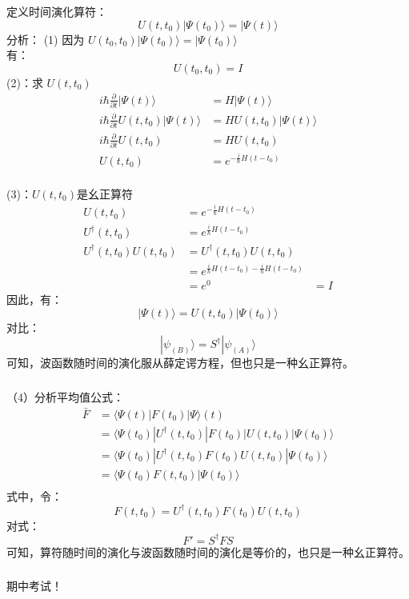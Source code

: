 \begin{frame}  
    \frametitle{}  
    定义时间演化算符：
    $$ U(t,t_0) |\Psi(t_0)\rangle = |\Psi(t)\rangle  $$
    \alert{分析}：
    (1) 因为 $ U(t_0,t_0) |\Psi(t_0)\rangle = |\Psi(t_0)\rangle  $ \\
     有：$$ U(t_0,t_0)=I $$
    (2)：求 $ U(t,t_0)$
    $$ \begin{aligned}
        i\hbar \frac{\partial }{\partial t} |\Psi(t)\rangle &= H|\Psi(t)\rangle  \\
        i\hbar \frac{\partial }{\partial t}  U(t,t_0) |\Psi(t)\rangle &= H U(t,t_0) |\Psi(t)\rangle  \\
        i\hbar \frac{\partial }{\partial t}  U(t,t_0)  &= H U(t,t_0)  \\
        U(t,t_0)  &= e^{-\frac{i}{\hbar} H(t-t_0)}  \\
    \end{aligned} $$
\end{frame} 

\begin{frame}  
    (3)：$ U(t,t_0)$是幺正算符
    $$ \begin{aligned}
        U(t,t_0)  &= e^{-\frac{i}{\hbar} H(t-t_0)}  \\
        U^\dagger (t,t_0)  &= e^{\frac{i}{\hbar} H(t-t_0)}  \\
        U^\dagger (t,t_0)U(t,t_0) &= U^\dagger (t,t_0)U(t,t_0) \\
         &=e^{\frac{i}{\hbar} H(t-t_0)-\frac{i}{\hbar} H(t-t_0)} \\
         &=e^0
         &=I
    \end{aligned} $$
    因此，有：
    $$ |\Psi(t)\rangle = U(t,t_0) |\Psi(t_0)\rangle   $$
    对比： 
    $$ |\psi_{(B)}\rangle = S^\dagger |\psi_{(A)}\rangle $$
    可知，波函数随时间的演化服从薛定谔方程，但也只是一种幺正算符。
\end{frame} 

\begin{frame}  
    \frametitle{} 
    （4）分析平均值公式：
    $$ \begin{aligned}
        \bar{F} &= \langle \Psi(t) |F(t_0) | \Psi \rangle(t)  \\
        &= \langle \Psi(t_0) |U^\dagger (t,t_0) |F(t_0) | U(t,t_0) |\Psi(t_0)\rangle   \\
        &= \langle \Psi(t_0) |U^\dagger (t,t_0) F(t_0) U(t,t_0) |\Psi(t_0)\rangle   \\
        &= \langle \Psi(t_0) F(t,t_0) |\Psi(t_0)\rangle   \\
    \end{aligned} $$
     式中，令： $$ F(t,t_0) =U^\dagger (t,t_0) F(t_0) U(t,t_0)$$
     对式：
     $$F'=S^\dagger F S $$
     可知，算符随时间的演化与波函数随时间的演化是等价的，也只是一种幺正算符。
\end{frame} 

\begin{frame}
    \frametitle{}  
    \centering
    \LARGE \color{red} 期中考试！ \\
\end{frame}